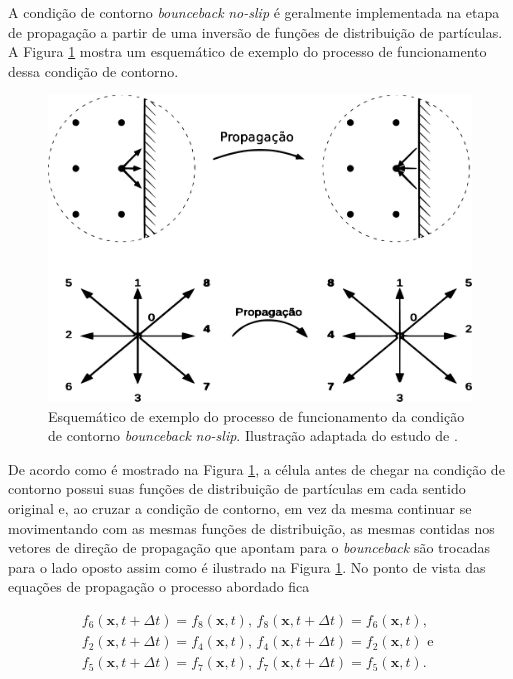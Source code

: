 A condição de contorno \textit{bounceback} \textit{no-slip} é geralmente implementada na etapa de propagação a partir de uma inversão de funções de distribuição de partículas. A Figura \ref{fig:bounceback} mostra um esquemático de exemplo do processo de funcionamento dessa condição de contorno. 

\begin{figure}[ht!]
\centering
  \includegraphics[width=.65\linewidth]{figuras/bounceback.pdf}
  \caption[Processo de funcionamento do \textit{bounceback} \textit{no-slip}]{Esquemático de exemplo do processo de funcionamento da condição de contorno \textit{bounceback} \textit{no-slip}. Ilustração adaptada do estudo de .}
  \label{fig:bounceback}
\end{figure}

De acordo como é mostrado na Figura \ref{fig:bounceback}, a célula antes de chegar na condição de contorno possui suas funções de distribuição de partículas em cada sentido original e, ao cruzar a condição de contorno, em vez da mesma continuar se movimentando com as mesmas funções de distribuição, as mesmas contidas nos vetores de direção de propagação que apontam para o \textit{bounceback} são trocadas para o lado oposto assim como é ilustrado na Figura \ref{fig:bounceback}. No ponto de vista das equações de propagação o processo abordado fica

\begin{gather*}
  f_{6}(\textbf{x}, t + \Delta t) = f_{8}(\textbf{x}, t)\text{,  } f_{8}(\textbf{x}, t + \Delta t) = f_{6}(\textbf{x}, t), \\
  f_{2}(\textbf{x}, t + \Delta t) = f_{4}(\textbf{x}, t)\text{,  } f_{4}(\textbf{x}, t + \Delta t) = f_{2}(\textbf{x}, t) \text{ e }\\
  f_{5}(\textbf{x}, t + \Delta t) = f_{7}(\textbf{x}, t)\text{,  } f_{7}(\textbf{x}, t + \Delta t) = f_{5}(\textbf{x}, t).
\label{eq:bounceback}
\end{gather*}

